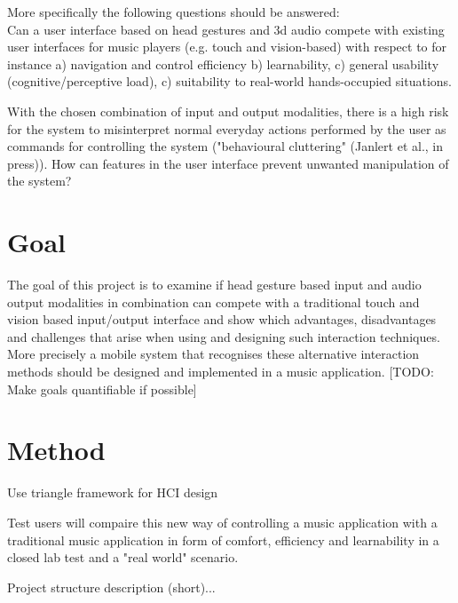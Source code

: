 More specifically the following questions should be answered:\\
Can a user interface based on head gestures and 3d audio compete with existing user interfaces for music players (e.g. touch and vision-based) with respect to for instance a) navigation and control efficiency b) learnability, c) general usability (cognitive/perceptive load), c) suitability to real-world hands-occupied situations. 

With the chosen combination of input and output modalities, there is a high risk for the system to misinterpret normal everyday actions performed by the user as commands for controlling the system ("behavioural cluttering" (Janlert et al., in press)). How can features in the user interface prevent unwanted manipulation of the system?

\section{Goal}
The goal of this project is to examine if head gesture based input and audio output modalities in combination can compete with a traditional touch and vision based input/output interface and show which advantages, disadvantages and challenges that arise when using and designing such interaction techniques. More precisely a mobile system that recognises these alternative interaction methods should be designed and implemented in a music application. [TODO: Make goals quantifiable if possible]

\section{Method}
Use triangle framework for HCI design \cite{mackay_hci_1997}

Test users will compaire this new way of controlling a music application with a traditional music application in form of comfort, efficiency and learnability in a closed lab test and a "real world" scenario.

Project structure description (short)...





